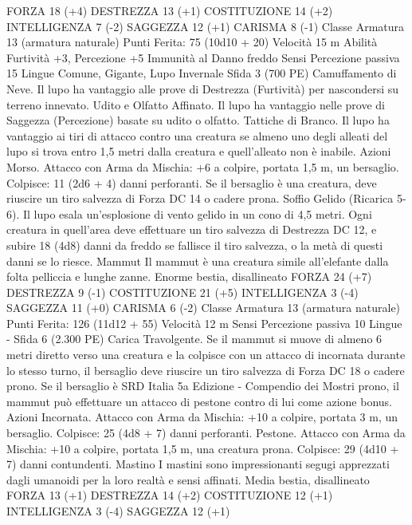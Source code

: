 \begin{multicols}{2}
FORZA 18 (+4)
DESTREZZA 13 (+1)
COSTITUZIONE 14 (+2)
INTELLIGENZA 7 (-2)
SAGGEZZA 12 (+1)
CARISMA 8 (-1)
Classe Armatura 13 (armatura naturale)
\hspace*{0pt}\hfill{Punti Ferita}: 75 (10d10 + 20)
Velocità 15 m
Abilità Furtività +3, Percezione +5
Immunità al Danno freddo
Sensi Percezione passiva 15
Lingue Comune, Gigante, Lupo Invernale
Sfida 3 (700 PE)
Camuffamento di Neve. Il lupo ha vantaggio alle prove di
Destrezza (Furtività) per nascondersi su terreno innevato.
Udito e Olfatto Affinato. Il lupo ha vantaggio nelle prove di
Saggezza (Percezione) basate su udito o olfatto.
Tattiche di Branco. Il lupo ha vantaggio ai tiri di attacco contro
una creatura se almeno uno degli alleati del lupo si trova entro
1,5 metri dalla creatura e quell’alleato non è inabile.
Azioni
Morso. Attacco con Arma da Mischia: +6 a colpire, portata 1,5
m, un bersaglio.
Colpisce: 11 (2d6 + 4) danni perforanti. Se il bersaglio è una
creatura, deve riuscire un tiro salvezza di Forza DC 14 o cadere
prona.
Soffio Gelido (Ricarica 5-6). Il lupo esala un’esplosione di vento
gelido in un cono di 4,5 metri. Ogni creatura in quell’area deve
effettuare un tiro salvezza di Destrezza DC 12, e subire 18 (4d8)
danni da freddo se fallisce il tiro salvezza, o la metà di questi
danni se lo riesce.
Mammut
Il mammut è una creatura simile all’elefante dalla folta
pelliccia e lunghe zanne.
Enorme bestia, disallineato
FORZA 24 (+7)
DESTREZZA 9 (-1)
COSTITUZIONE 21 (+5)
INTELLIGENZA 3 (-4)
SAGGEZZA 11 (+0)
CARISMA 6 (-2)
Classe Armatura 13 (armatura naturale)
\hspace*{0pt}\hfill{Punti Ferita}: 126 (11d12 + 55)
Velocità 12 m
Sensi Percezione passiva 10
Lingue -
Sfida 6 (2.300 PE)
Carica Travolgente. Se il mammut si muove di almeno 6 metri
diretto verso una creatura e la colpisce con un attacco di
incornata durante lo stesso turno, il bersaglio deve riuscire un
tiro salvezza di Forza DC 18 o cadere prono. Se il bersaglio è 
SRD Italia 5a Edizione - Compendio dei Mostri
prono, il mammut può effettuare un attacco di pestone contro di
lui come azione bonus.
Azioni
Incornata. Attacco con Arma da Mischia: +10 a colpire, portata
3 m, un bersaglio.
Colpisce: 25 (4d8 + 7) danni perforanti.
Pestone. Attacco con Arma da Mischia: +10 a colpire, portata
1,5 m, una creatura prona.
Colpisce: 29 (4d10 + 7) danni contundenti.
Mastino
I mastini sono impressionanti segugi apprezzati dagli
umanoidi per la loro realtà e sensi affinati.
Media bestia, disallineato
FORZA 13 (+1)
DESTREZZA 14 (+2)
COSTITUZIONE 12 (+1)
INTELLIGENZA 3 (-4)
SAGGEZZA 12 (+1)

\end{multicols}
